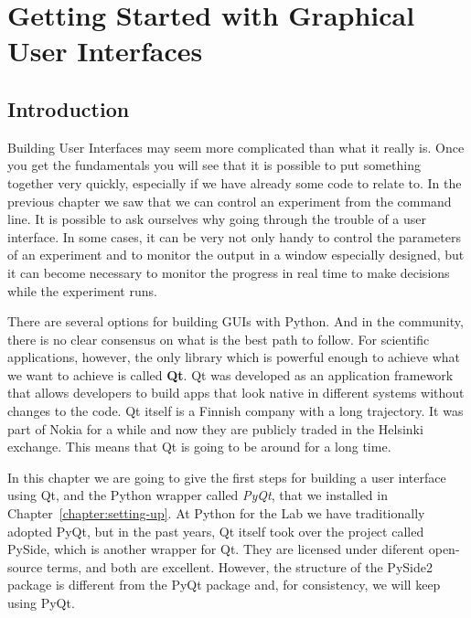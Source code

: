 \chapter{Getting Started with Graphical User Interfaces}\label{ch:gui}

\section{Introduction}\label{sec:gui-introduction}
Building User Interfaces may seem more complicated than what it really is. Once you get the fundamentals you will see that it is possible to put something together very quickly, especially if we have already some code to relate to. In the previous chapter we saw that we can control an experiment from the command line. It is possible to ask ourselves why going through the trouble of a user interface. In some cases, it can be very not only handy to control the parameters of an experiment and to monitor the output in a window especially designed, but it can become necessary to monitor the progress in real time to make decisions while the experiment runs.

There are several options for building GUIs with Python. And in the community, there is no clear consensus on what is the best path to follow. For scientific applications, however, the only library which is powerful enough to achieve what we want to achieve is called \textbf{Qt}. Qt was developed as an application framework that allows developers to build apps that look native in different systems without changes to the code. Qt itself is a Finnish company with a long trajectory. It was part of Nokia for a while and now they are publicly traded in the Helsinki exchange. This means that Qt is going to be around for a long time.

In this chapter we are going to give the first steps for building a user interface using Qt, and the Python wrapper called \emph{PyQt}, that we installed in Chapter~\ref{chapter:setting-up}. At Python for the Lab we have traditionally adopted PyQt, but in the past years, Qt itself took over the project called PySide, which is another wrapper for Qt. They are licensed under diferent open-source terms, and both are excellent. However, the structure of the PySide2 package is different from the PyQt package and, for consistency, we will keep using PyQt.



